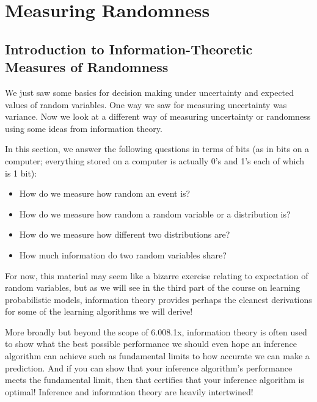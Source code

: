 \documentclass[6008notes.tex]{subfiles}
\begin{document}
\graphicspath{ {images/measrand/} }

\section{Measuring Randomness}

\subsection{Introduction to Information-Theoretic Measures of Randomness}

We just saw some basics for decision making under uncertainty and expected values of random variables. One way we saw for measuring uncertainty was variance. Now we look at a different way of measuring uncertainty or randomness using some ideas from information theory.

In this section, we answer the following questions in terms of bits (as in bits on a computer; everything stored on a computer is actually 0's and 1's each of which is 1 bit):

\begin{itemize}
\item How do we measure how random an event is?

\item How do we measure how random a random variable or a distribution is?

\item How do we measure how different two distributions are?

\item How much information do two random variables share?
\end{itemize}

For now, this material may seem like a bizarre exercise relating to expectation of random variables, but as we will see in the third part of the course on learning probabilistic models, information theory provides perhaps the cleanest derivations for some of the learning algorithms we will derive!

More broadly but beyond the scope of 6.008.1x, information theory is often used to show what the best possible performance we should even hope an inference algorithm can achieve such as fundamental limits to how accurate we can make a prediction. And if you can show that your inference algorithm's performance meets the fundamental limit, then that certifies that your inference algorithm is optimal! Inference and information theory are heavily intertwined!
\end{document}
